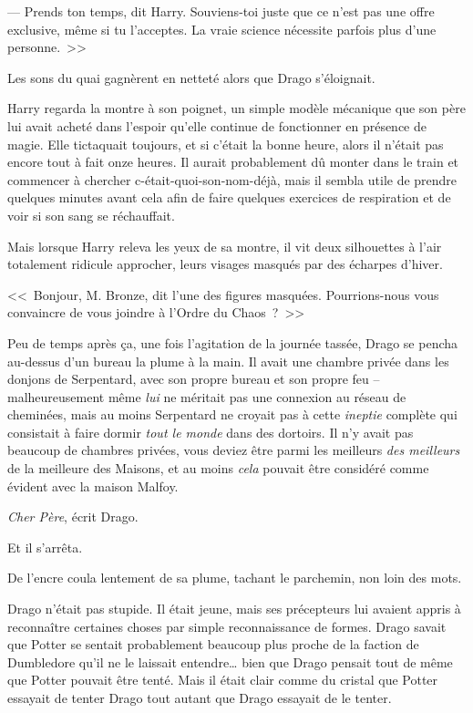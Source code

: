 --- Prends ton temps, dit Harry. Souviens-toi juste que ce n'est pas une offre exclusive, même si tu l'acceptes. La vraie science nécessite parfois plus d'une personne.~>>

Les sons du quai gagnèrent en netteté alors que Drago s'éloignait.

Harry regarda la montre à son poignet, un simple modèle mécanique que son père lui avait acheté dans l'espoir qu'elle continue de fonctionner en présence de magie. Elle tictaquait toujours, et si c'était la bonne heure, alors il n'était pas encore tout à fait onze heures. Il aurait probablement dû monter dans le train et commencer à chercher c-était-quoi-son-nom-déjà, mais il sembla utile de prendre quelques minutes avant cela afin de faire quelques exercices de respiration et de voir si son sang se réchauffait.

Mais lorsque Harry releva les yeux de sa montre, il vit deux silhouettes à l'air totalement ridicule approcher, leurs visages masqués par des écharpes d'hiver.

<<~Bonjour, M. Bronze, dit l'une des figures masquées. Pourrions-nous vous convaincre de vous joindre à l'Ordre du Chaos~?~>>


Peu de temps après ça, une fois l'agitation de la journée tassée, Drago se pencha au-dessus d'un bureau la plume à la main. Il avait une chambre privée dans les donjons de Serpentard, avec son propre bureau et son propre feu -- malheureusement même \emph{lui} ne méritait pas une connexion au réseau de cheminées, mais au moins Serpentard ne croyait pas à cette \emph{ineptie} complète qui consistait à faire dormir \emph{tout le monde} dans des dortoirs. Il n'y avait pas beaucoup de chambres privées, vous deviez être parmi les meilleurs \emph{des meilleurs} de la meilleure des Maisons, et au moins \emph{cela} pouvait être considéré comme évident avec la maison Malfoy.

\emph{Cher Père}, écrit Drago.

Et il s'arrêta.

De l'encre coula lentement de sa plume, tachant le parchemin, non loin des mots.

Drago n'était pas stupide. Il était jeune, mais ses précepteurs lui avaient appris à reconnaître certaines choses par simple reconnaissance de formes. Drago savait que Potter se sentait probablement beaucoup plus proche de la faction de Dumbledore qu'il ne le laissait entendre… bien que Drago pensait tout de même que Potter pouvait être tenté. Mais il était clair comme du cristal que Potter essayait de tenter Drago tout autant que Drago essayait de le tenter.

